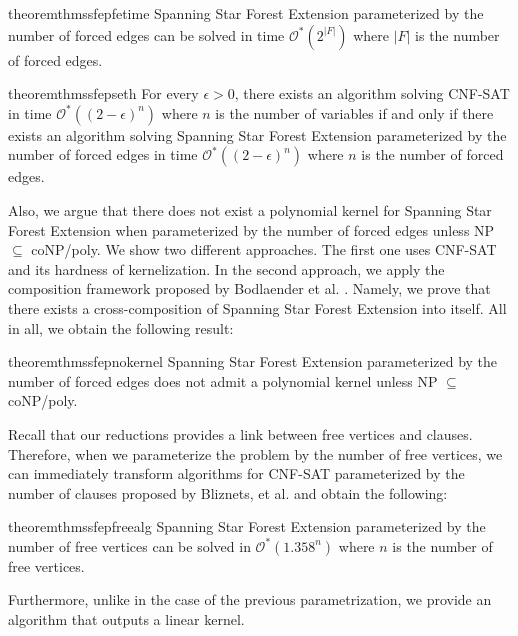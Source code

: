 \documentclass[en]{pracamgr}
\theoremstyle{definition}
\newcommand{\ssfep}{{\sc Spanning Star Forest Extension}}
\newcommand{\cnfsat}{{\sc CNF-SAT}}
\begin{document}
\begin{restatable}{theorem}{thmssfepfetime}\label{thm-ssfep-fe-time}
	\ssfep{} parameterized by the number of forced edges can be solved in time $\mathcal{O}^*(2^{|F|})$ where $|F|$ is the number of forced edges.
\end{restatable}

\begin{restatable}{theorem}{thmssfepseth}\label{thm-ssfep-seth}
	For every $\epsilon > 0$, there exists an algorithm solving \cnfsat{} in time $\mathcal{O}^*((2-\epsilon)^n)$ where $n$ is the number of variables if and only if there exists an algorithm solving \ssfep{} parameterized by the number of forced edges in time $\mathcal{O}^*((2-\epsilon)^n)$ where $n$ is the number of forced edges.
\end{restatable}

\noindent
Also, we argue that there does not exist a polynomial kernel for \ssfep{} when parameterized by the number of forced edges unless NP $\subseteq$ coNP/poly. We show two different approaches. The first one uses \cnfsat{} and its hardness of kernelization. In the second approach, we apply the composition framework proposed by Bodlaender et al. \cite{Bodlaender}. Namely, we prove that there exists a cross-composition of \ssfep{} into itself. All in all, we obtain the following result:

\begin{restatable}{theorem}{thmssfepnokernel}\label{thm-ssfep-nokernel}
	\ssfep{} parameterized by the number of forced edges does not admit a polynomial kernel unless NP $\subseteq$ coNP/poly.
\end{restatable}

Recall that our reductions provides a link between free vertices and clauses. Therefore, when we parameterize the problem by the number of free vertices, we can immediately transform algorithms for \cnfsat{} parameterized by the number of clauses proposed by Bliznets, et al.\cite{MAXSAT} and obtain the following:

\begin{restatable}{theorem}{thmssfepfreealg}\label{thm-ssfep-free-alg}
	\ssfep{} parameterized by the number of free vertices can be solved in $\mathcal{O}^*(1.358^n)$ where $n$ is the number of free vertices.
\end{restatable}

\noindent
Furthermore, unlike in the case of the previous parametrization, we provide an algorithm that outputs a linear kernel.
\end{document}
